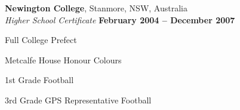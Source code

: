 \documentclass[margin,line]{resume}
\begin{document}
\begin{resume}
    \textbf{Newington College}, Stanmore, NSW, Australia \vspace{2mm}\\\vspace{1mm}%
    \textsl{Higher School Certificate} \hfill \textbf{February 2004 -- December 2007}\vspace{-3mm}\\\vspace{-1mm}%
    \begin{list2}
        \item Full College Prefect 
        \item Metcalfe House Honour Colours
	\item 1st Grade Football
	\item 3rd Grade GPS Representative Football 
    \end{list2}\vspace{-1.5mm}







\end{resume}
\end{document}
